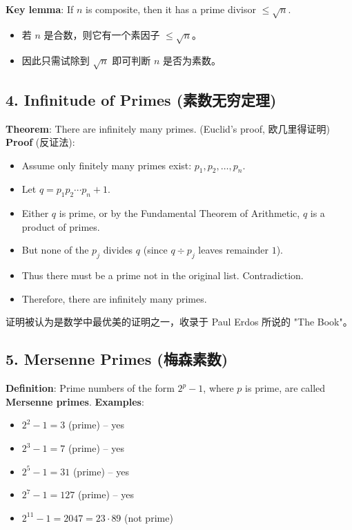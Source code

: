 \documentclass[10pt,a4paper,openany]{ctexbook}
\theoremstyle{definition}
\theoremstyle{remark}
\renewenvironment{quote}
  {\list{}{\leftmargin=1em\rightmargin=0pt\topsep=0.5pt\partopsep=0pt}\item[]}
  {\endlist}
\begin{document}
\textbf{Key lemma}: If $n$ is composite, then it has a prime divisor $\leq \sqrt{n}$.
\begin{itemize}
\item 若 $n$ 是合数，则它有一个素因子 $\leq \sqrt{n}$。
\item 因此只需试除到 $\sqrt{n}$ 即可判断 $n$ 是否为素数。

\end{itemize}

\vspace{-2pt}

\subsection{4. Infinitude of Primes (素数无穷定理)}

\textbf{Theorem}: There are infinitely many primes. (Euclid's proof, 欧几里得证明)
\textbf{Proof} (反证法):
\begin{itemize}
\item Assume only finitely many primes exist: $p_1, p_2, \dots, p_n$.
\item Let $q = p_1 p_2 \cdots p_n + 1$.
\item Either $q$ is prime, or by the Fundamental Theorem of Arithmetic, $q$ is a product of primes.
\item But none of the $p_j$ divides $q$ (since $q \div p_j$ leaves remainder $1$).
\item Thus there must be a prime not in the original list. Contradiction.
\item Therefore, there are infinitely many primes.

\end{itemize}

\begin{quote}
证明被认为是数学中最优美的证明之一，收录于 Paul Erdos 所说的 "The Book"。

\end{quote}
\vspace{-2pt}

\subsection{5. Mersenne Primes (梅森素数)}

\textbf{Definition}: Prime numbers of the form $2^p - 1$, where $p$ is prime, are called \textbf{Mersenne primes}.
\textbf{Examples}:
\begin{itemize}
\item $2^2 - 1 = 3$ (prime) -- yes
\item $2^3 - 1 = 7$ (prime) -- yes
\item $2^5 - 1 = 31$ (prime) -- yes
\item $2^7 - 1 = 127$ (prime) -- yes
\item $2^{11} - 1 = 2047 = 23 \cdot 89$ (not prime)

\end{itemize}
\end{document}
